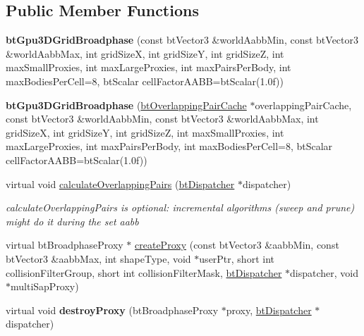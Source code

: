 \subsection*{Public Member Functions}
\begin{DoxyCompactItemize}
\item 
\hypertarget{classbt_gpu3_d_grid_broadphase_a16e59d6930a222fd5118611d4fccf0ba}{{\bfseries bt\+Gpu3\+D\+Grid\+Broadphase} (const bt\+Vector3 \&world\+Aabb\+Min, const bt\+Vector3 \&world\+Aabb\+Max, int grid\+Size\+X, int grid\+Size\+Y, int grid\+Size\+Z, int max\+Small\+Proxies, int max\+Large\+Proxies, int max\+Pairs\+Per\+Body, int max\+Bodies\+Per\+Cell=8, bt\+Scalar cell\+Factor\+A\+A\+B\+B=bt\+Scalar(1.\+0f))}\label{classbt_gpu3_d_grid_broadphase_a16e59d6930a222fd5118611d4fccf0ba}

\item 
\hypertarget{classbt_gpu3_d_grid_broadphase_a05fbb3eab41b49d68d270d2cf7d3fa00}{{\bfseries bt\+Gpu3\+D\+Grid\+Broadphase} (\hyperlink{classbt_overlapping_pair_cache}{bt\+Overlapping\+Pair\+Cache} $\ast$overlapping\+Pair\+Cache, const bt\+Vector3 \&world\+Aabb\+Min, const bt\+Vector3 \&world\+Aabb\+Max, int grid\+Size\+X, int grid\+Size\+Y, int grid\+Size\+Z, int max\+Small\+Proxies, int max\+Large\+Proxies, int max\+Pairs\+Per\+Body, int max\+Bodies\+Per\+Cell=8, bt\+Scalar cell\+Factor\+A\+A\+B\+B=bt\+Scalar(1.\+0f))}\label{classbt_gpu3_d_grid_broadphase_a05fbb3eab41b49d68d270d2cf7d3fa00}

\item 
virtual void \hyperlink{classbt_gpu3_d_grid_broadphase_ad25b335c5cf7be1f4eee024ff91e5635}{calculate\+Overlapping\+Pairs} (\hyperlink{classbt_dispatcher}{bt\+Dispatcher} $\ast$dispatcher)
\begin{DoxyCompactList}\small\item\em calculate\+Overlapping\+Pairs is optional\+: incremental algorithms (sweep and prune) might do it during the set aabb \end{DoxyCompactList}\item 
virtual bt\+Broadphase\+Proxy $\ast$ \hyperlink{classbt_gpu3_d_grid_broadphase_ad381f8a0aca01a7147b7a3eafad9ac5a}{create\+Proxy} (const bt\+Vector3 \&aabb\+Min, const bt\+Vector3 \&aabb\+Max, int shape\+Type, void $\ast$user\+Ptr, short int collision\+Filter\+Group, short int collision\+Filter\+Mask, \hyperlink{classbt_dispatcher}{bt\+Dispatcher} $\ast$dispatcher, void $\ast$multi\+Sap\+Proxy)
\item 
\hypertarget{classbt_gpu3_d_grid_broadphase_ab86c095b13af4025a1ba78c811fc1052}{virtual void {\bfseries destroy\+Proxy} (bt\+Broadphase\+Proxy $\ast$proxy, \hyperlink{classbt_dispatcher}{bt\+Dispatcher} $\ast$dispatcher)}\label{classbt_gpu3_d_grid_broadphase_ab86c095b13af4025a1ba78c811fc1052}


\end{DoxyCompactItemize}
